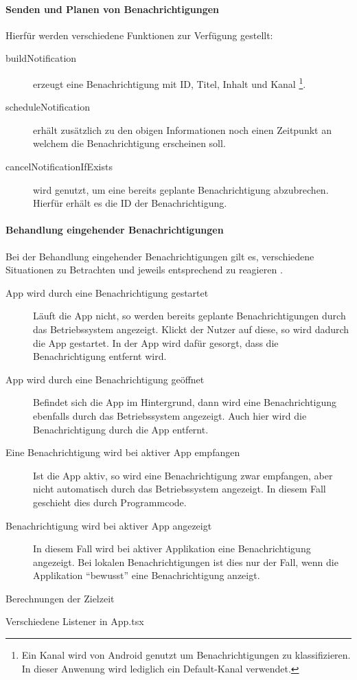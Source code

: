\paragraph{Senden und Planen von Benachrichtigungen}
Hierfür werden verschiedene Funktionen zur Verfügung gestellt:
\begin{description}
    \item[buildNotification] erzeugt eine Benachrichtigung mit ID, Titel, Inhalt und Kanal
        \footnote{Ein Kanal wird von Android genutzt um Benachrichtigungen zu klassifizieren. In dieser Anwenung wird lediglich ein Default-Kanal verwendet.}.
    \item[scheduleNotification] erhält zusätzlich zu den obigen Informationen noch einen Zeitpunkt an welchem die Benachrichtigung erscheinen soll.
    \item[cancelNotificationIfExists] wird genutzt, um eine bereits geplante Benachrichtigung abzubrechen. Hierfür erhält es die ID der Benachrichtigung.
\end{description}

\paragraph{Behandlung eingehender Benachrichtigungen}
Bei der Behandlung eingehender Benachrichtigungen gilt es,
verschiedene Situationen zu Betrachten und jeweils entsprechend zu reagieren \cite{Introduc87:online}.
\begin{description}
    \item[App wird durch eine Benachrichtigung gestartet]
    Läuft die App nicht, so werden bereits geplante Benachrichtigungen durch das Betriebssystem angezeigt.
    Klickt der Nutzer auf diese, so wird dadurch die App gestartet.
    In der App wird dafür gesorgt, dass die Benachrichtigung entfernt wird.
    
    \item[App wird durch eine Benachrichtigung geöffnet]
    Befindet sich die App im Hintergrund,
    dann wird eine Benachrichtigung ebenfalls durch das Betriebssystem angezeigt.
    Auch hier wird die Benachrichtigung durch die App entfernt.

    \item[Eine Benachrichtigung wird bei aktiver App empfangen]
    Ist die App aktiv, so wird eine Benachrichtigung zwar empfangen,
    aber nicht automatisch durch das Betriebssystem angezeigt.
    In diesem Fall geschieht dies durch Programmcode.
    
    \item[Benachrichtigung wird bei aktiver App angezeigt]
    In diesem Fall wird bei aktiver Applikation eine Benachrichtigung angezeigt.
    Bei lokalen Benachrichtigungen ist dies nur der Fall,
    wenn die Applikation \enquote{bewusst} eine Benachrichtigung anzeigt.

\end{description}


Berechnungen der Zielzeit

Verschiedene Listener in App.tsx

